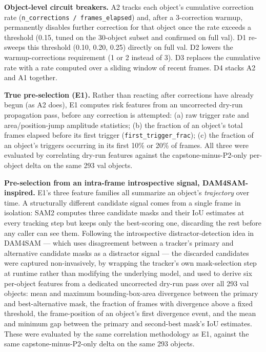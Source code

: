 \documentclass[11pt]{article}
\begin{document}
\textbf{Object-level circuit breakers.} A2 tracks each object's cumulative correction rate (\texttt{n\_corrections / frames\_elapsed}) and, after a 3-correction warmup, permanently disables further correction for that object once the rate exceeds a threshold (0.15, tuned on the 30-object subset and confirmed on full val). D1 re-sweeps this threshold (0.10, 0.20, 0.25) directly on full val. D2 lowers the warmup-corrections requirement (1 or 2 instead of 3). D3 replaces the cumulative rate with a rate computed over a sliding window of recent frames. D4 stacks A2 and A1 together.

\textbf{True pre-selection (E1).} Rather than reacting after corrections have already begun (as A2 does), E1 computes risk features from an uncorrected dry-run propagation pass, before any correction is attempted: (a) raw trigger rate and area/position-jump amplitude statistics; (b) the fraction of an object's total frames elapsed before its first trigger (\texttt{first\_trigger\_frac}); (c) the fraction of an object's triggers occurring in its first 10\% or 20\% of frames. All three were evaluated by correlating dry-run features against the capstone-minus-P2-only per-object delta on the same 293 val objects.

\textbf{Pre-selection from an intra-frame introspective signal, DAM4SAM-inspired.} E1's three feature families all summarize an object's \emph{trajectory} over time. A structurally different candidate signal comes from a single frame in isolation: SAM2 computes three candidate masks and their IoU estimates at every tracking step but keeps only the best-scoring one, discarding the rest before any caller can see them. Following the introspective distractor-detection idea in DAM4SAM \citep{videnovic2024} — which uses disagreement between a tracker's primary and alternative candidate masks as a distractor signal — the discarded candidates were captured non-invasively, by wrapping the tracker's own mask-selection step at runtime rather than modifying the underlying model, and used to derive six per-object features from a dedicated uncorrected dry-run pass over all 293 val objects: mean and maximum bounding-box-area divergence between the primary and best-alternative mask, the fraction of frames with divergence above a fixed threshold, the frame-position of an object's first divergence event, and the mean and minimum gap between the primary and second-best mask's IoU estimates. These were evaluated by the same correlation methodology as E1, against the same capstone-minus-P2-only delta on the same 293 objects.
\end{document}
